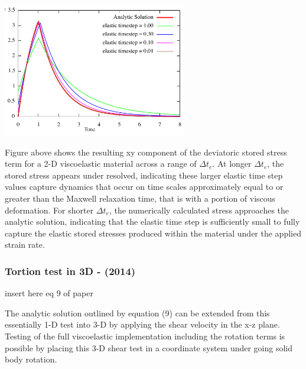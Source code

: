 \begin{center}
\includegraphics[width=8cm]{images/viscoelasticity/famc14a}\\
\end{center}

Figure above shows the resulting xy component of the deviatoric stored stress term for a 2-D viscoelastic material across a range of $\Delta t_e$. 
At longer $\Delta t_e$, the stored stress appears under resolved, indicating these larger elastic time step values capture dynamics that occur on time scales approximately equal to or greater than the Maxwell relaxation time, that is with a portion of viscous deformation. For shorter $\Delta t_e$,
the numerically calculated stress approaches the analytic solution, indicating that the elastic time step is
sufficiently small to fully capture the elastic stored stresses produced within the material under the
applied strain rate.







\subsubsection{Tortion test in 3D - \textcite{famc14} (2014)}

insert here eq 9 of paper

The analytic solution outlined by equation (9) can be extended from this 
essentially 1-D test into 3-D by applying the shear velocity in the x-z plane. 
Testing of the full viscoelastic implementation including the
rotation terms is possible by placing this 3-D shear test in a 
coordinate system under going solid body rotation. 

